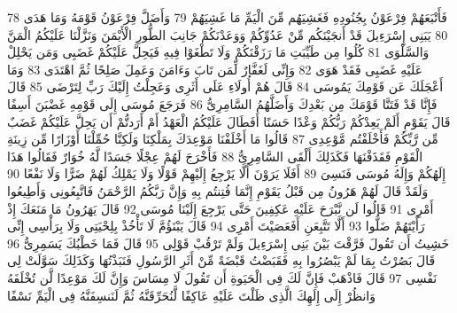 \documentclass[20pt,a4paper]{article}
\begin{document}
{\tiny\colorbox{cl_aya}{78}} فَأَتْبَعَهُمْ فِرْعَوْنُ بِجُنُودِهِ فَغَشِيَهُم مِّنَ الْيَمِّ مَا غَشِيَهُمْ
{\tiny\colorbox{cl_aya}{79}} وَأَضَلَّ فِرْعَوْنُ قَوْمَهُ وَمَا هَدَى
{\tiny\colorbox{cl_aya}{80}} يَبَنِى إِسْرَءِيلَ قَدْ أَنجَيْنَكُم مِّنْ عَدُوِّكُمْ وَوَعَدْنَكُمْ جَانِبَ الطُّورِ الْأَيْمَنَ وَنَزَّلْنَا عَلَيْكُمُ الْمَنَّ وَالسَّلْوَى
{\tiny\colorbox{cl_aya}{81}} كُلُوا مِن طَيِّبَتِ مَا رَزَقْنَكُمْ وَلَا تَطْغَوْا فِيهِ فَيَحِلَّ عَلَيْكُمْ غَضَبِى وَمَن يَحْلِلْ عَلَيْهِ غَضَبِى فَقَدْ هَوَى
{\tiny\colorbox{cl_aya}{82}} وَإِنِّى لَغَفَّارٌ لِّمَن تَابَ وَءَامَنَ وَعَمِلَ صَلِحًا ثُمَّ اهْتَدَى
{\tiny\colorbox{cl_aya}{83}} وَمَا أَعْجَلَكَ عَن قَوْمِكَ يَمُوسَى
{\tiny\colorbox{cl_aya}{84}} قَالَ هُمْ أُولَاءِ عَلَى أَثَرِى وَعَجِلْتُ إِلَيْكَ رَبِّ لِتَرْضَى
{\tiny\colorbox{cl_aya}{85}} قَالَ فَإِنَّا قَدْ فَتَنَّا قَوْمَكَ مِن بَعْدِكَ وَأَضَلَّهُمُ السَّامِرِىُّ
{\tiny\colorbox{cl_aya}{86}} فَرَجَعَ مُوسَى إِلَى قَوْمِهِ غَضْبَنَ أَسِفًا قَالَ يَقَوْمِ أَلَمْ يَعِدْكُمْ رَبُّكُمْ وَعْدًا حَسَنًا أَفَطَالَ عَلَيْكُمُ الْعَهْدُ أَمْ أَرَدتُّمْ أَن يَحِلَّ عَلَيْكُمْ غَضَبٌ مِّن رَّبِّكُمْ فَأَخْلَفْتُم مَّوْعِدِى
{\tiny\colorbox{cl_aya}{87}} قَالُوا مَا أَخْلَفْنَا مَوْعِدَكَ بِمَلْكِنَا وَلَكِنَّا حُمِّلْنَا أَوْزَارًا مِّن زِينَةِ الْقَوْمِ فَقَذَفْنَهَا فَكَذَلِكَ أَلْقَى السَّامِرِىُّ
{\tiny\colorbox{cl_aya}{88}} فَأَخْرَجَ لَهُمْ عِجْلًا جَسَدًا لَّهُ خُوَارٌ فَقَالُوا هَذَا إِلَهُكُمْ وَإِلَهُ مُوسَى فَنَسِىَ
{\tiny\colorbox{cl_aya}{89}} أَفَلَا يَرَوْنَ أَلَّا يَرْجِعُ إِلَيْهِمْ قَوْلًا وَلَا يَمْلِكُ لَهُمْ ضَرًّا وَلَا نَفْعًا
{\tiny\colorbox{cl_aya}{90}} وَلَقَدْ قَالَ لَهُمْ هَرُونُ مِن قَبْلُ يَقَوْمِ إِنَّمَا فُتِنتُم بِهِ وَإِنَّ رَبَّكُمُ الرَّحْمَنُ فَاتَّبِعُونِى وَأَطِيعُوا أَمْرِى
{\tiny\colorbox{cl_aya}{91}} قَالُوا لَن نَّبْرَحَ عَلَيْهِ عَكِفِينَ حَتَّى يَرْجِعَ إِلَيْنَا مُوسَى
{\tiny\colorbox{cl_aya}{92}} قَالَ يَهَرُونُ مَا مَنَعَكَ إِذْ رَأَيْتَهُمْ ضَلُّوا
{\tiny\colorbox{cl_aya}{93}} أَلَّا تَتَّبِعَنِ أَفَعَصَيْتَ أَمْرِى
{\tiny\colorbox{cl_aya}{94}} قَالَ يَبْنَؤُمَّ لَا تَأْخُذْ بِلِحْيَتِى وَلَا بِرَأْسِى إِنِّى خَشِيتُ أَن تَقُولَ فَرَّقْتَ بَيْنَ بَنِى إِسْرَءِيلَ وَلَمْ تَرْقُبْ قَوْلِى
{\tiny\colorbox{cl_aya}{95}} قَالَ فَمَا خَطْبُكَ يَسَمِرِىُّ
{\tiny\colorbox{cl_aya}{96}} قَالَ بَصُرْتُ بِمَا لَمْ يَبْصُرُوا بِهِ فَقَبَضْتُ قَبْضَةً مِّنْ أَثَرِ الرَّسُولِ فَنَبَذْتُهَا وَكَذَلِكَ سَوَّلَتْ لِى نَفْسِى
{\tiny\colorbox{cl_aya}{97}} قَالَ فَاذْهَبْ فَإِنَّ لَكَ فِى الْحَيَوةِ أَن تَقُولَ لَا مِسَاسَ وَإِنَّ لَكَ مَوْعِدًا لَّن تُخْلَفَهُ وَانظُرْ إِلَى إِلَهِكَ الَّذِى ظَلْتَ عَلَيْهِ عَاكِفًا لَّنُحَرِّقَنَّهُ ثُمَّ لَنَنسِفَنَّهُ فِى الْيَمِّ نَسْفًا
\end{document}
